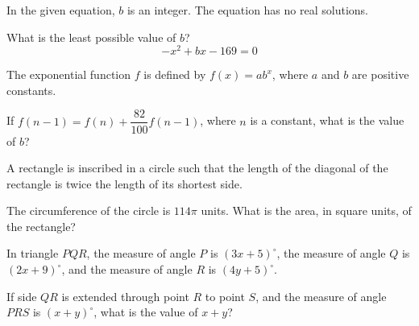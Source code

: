 \noindent\markforreview
\vspace{1em}

In the given equation, \(b\) is an integer. The equation has no real solutions.

What is the least possible value of \(b\)?
\[
-x^2 + bx - 169 = 0
\]

\vspace{0.75em}


\vspace{2em}
\newpage

\noindent\markforreview
\vspace{1em}

The exponential function \(f\) is defined by \(f(x) = ab^x\), where \(a\) and \(b\) are positive constants.

If \(f(n - 1) = f(n) + \dfrac{82}{100}f(n - 1)\), where \(n\) is a constant, what is the value of \(b\)?

\vspace{0.75em}


\vspace{2em}
\newpage

\noindent\markforreview
\vspace{1em}

A rectangle is inscribed in a circle such that the length of the diagonal of the rectangle is twice the length of its shortest side.

The circumference of the circle is \(114\pi\) units. What is the area, in square units, of the rectangle?

\vspace{0.75em}


\vspace{2em}
\newpage

\noindent\markforreview
\vspace{1em}

In triangle \(PQR\), the measure of angle \(P\) is \((3x + 5)^\circ\), the measure of angle \(Q\) is \((2x + 9)^\circ\), and the measure of angle \(R\) is \((4y + 5)^\circ\).

If side \(QR\) is extended through point \(R\) to point \(S\), and the measure of angle \(PRS\) is \((x + y)^\circ\), what is the value of \(x + y\)?

